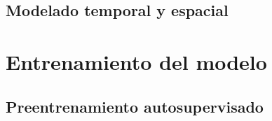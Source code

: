 \subsection{Modelado temporal y espacial}




\section{Entrenamiento del modelo}

\subsection{Preentrenamiento autosupervisado}




